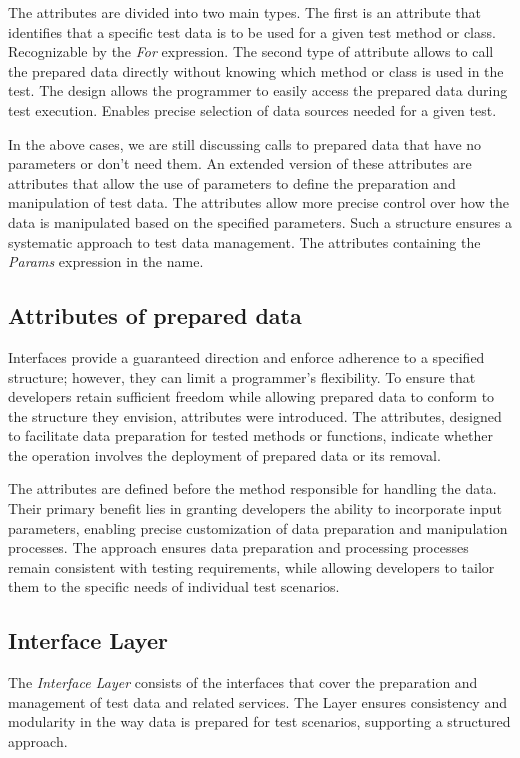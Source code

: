 The attributes are divided into two main types. The first is an attribute that identifies that a specific test data is to be used for a given test method or class. Recognizable by the \textit{For} expression. The second type of attribute allows to call the prepared data directly without knowing which method or class is used in the test. The design allows the programmer to easily access the prepared data during test execution. Enables precise selection of data sources needed for a given test.

In the above cases, we are still discussing calls to prepared data that have no parameters or don't need them. An extended version of these attributes are attributes that allow the use of parameters to define the preparation and manipulation of test data. The attributes allow more precise control over how the data is manipulated based on the specified parameters.  Such a structure ensures a systematic approach to test data management. The attributes containing the \textit{Params} expression in the name.

\subsection*{Attributes of prepared data}

Interfaces provide a guaranteed direction and enforce adherence to a specified structure; however, they can limit a programmer’s flexibility. To ensure that developers retain sufficient freedom while allowing prepared data to conform to the structure they envision, attributes were introduced. The attributes, designed to facilitate data preparation for tested methods or functions, indicate whether the operation involves the deployment of prepared data or its removal.

The attributes are defined before the method responsible for handling the data. Their primary benefit lies in granting developers the ability to incorporate input parameters, enabling precise customization of data preparation and manipulation processes.
The approach ensures data preparation and processing processes remain consistent with testing requirements, while allowing developers to tailor them to the specific needs of individual test scenarios.


\subsection{Interface Layer}
The \textit{Interface Layer} consists of the interfaces that cover the preparation and management of test data and related services. The Layer ensures consistency and modularity in the way data is prepared for test scenarios, supporting a structured approach.

